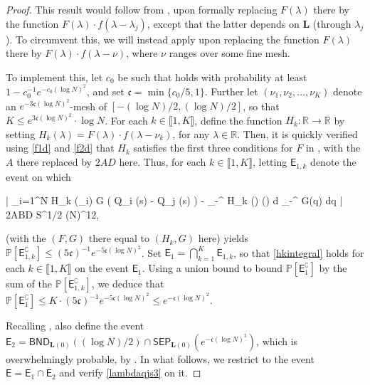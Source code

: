 \documentclass{amsart}
\numberwithin{equation}{section}
\theoremstyle{remark}
\theoremstyle{definition}
\begin{document}
	\begin{proof} 
		
		This result would follow from , upon formally replacing $F(\lambda)$ there by the function $F(\lambda) \cdot f(\lambda-\lambda_j)$, except that the latter depends on $\bm{L}$ (through $\lambda_j$). To circumvent this, we will instead apply  upon replacing the function $F(\lambda)$ there by $F(\lambda) \cdot f(\lambda - \nu)$, where $\nu$ ranges over some fine mesh. 
		
		To implement this, let $c_0$ be such that  holds with probability at least $1 - c_0^{-1} e^{-c_0 (\log N)^2}$, and set $\mathfrak{c} = \min \{ c_0 / 5, 1 \}$. Further let $(\nu_1, \nu_2, \ldots , \nu_K)$ denote an $e^{-3\mathfrak{c}(\log N)^2}$-mesh of $[ -(\log N) / 2, (\log N) / 2 ]$, so that $K \le  e^{3\mathfrak{c} (\log N)^2} \cdot \log N$. For each $k \in \llbracket 1, K \rrbracket$, define the function $H_k : \mathbb{R} \rightarrow \mathbb{R}$ by setting $H_k (\lambda) = F(\lambda) \cdot f(\lambda - \nu_k)$, for any $\lambda \in \mathbb{R}$. Then, it is quickly verified using \eqref{f1d} and \eqref{f2d} that $H_k$ satisfies the first three conditions for $F$ in , with the $A$ there replaced by $2AD$ here. Thus, for each $k \in \llbracket 1, K \rrbracket$, letting $\mathsf{E}_{1,k}$ denote the event on which 
		\begin{flalign}
			\label{hkintegral} 
			\Bigg| \displaystyle\sum_{i=1}^N H_k (\lambda_i) \cdot G ( Q_i (s) - Q_j (s) ) - \displaystyle\int_{-\infty}^{\infty} H_k (\lambda) \varrho (\lambda) d \lambda \displaystyle\int_{-\infty}^{\infty} G(\alpha q) dq \Bigg| \le 2ABD S^{1/2} (\log N)^{12},
		\end{flalign}
	
		\noindent {} (with the $(F, G)$ there equal to $(H_k, G)$ here) yields $\mathbb{P} [\mathsf{E}_{1,k}^{\complement}] \le (5\mathfrak{c})^{-1} e^{-5 \mathfrak{c} (\log N)^2}$. Set $\mathsf{E}_1 = \bigcap_{k=1}^K \mathsf{E}_{1,k}$, so that \eqref{hkintegral} holds for each $k \in \llbracket 1, K \rrbracket$ on the event $\mathsf{E}_1$. Using a union bound to bound $\mathbb{P}[\mathsf{E}_1^{\complement}]$ by the sum of the $\mathbb{P}[\mathsf{E}_{1,k}^{\complement}]$, we deduce that $\mathbb{P}[ \mathsf{E}_1^{\complement} ] \le K \cdot (5\mathfrak{c})^{-1} e^{-5 \mathfrak{c} (\log N)^2} \le e^{-\mathfrak{c} (\log N)^2}$.
		
		 Recalling , also define the event $\mathsf{E}_2 = \mathsf{BND}_{\bm{L}(0)} ( (\log N) / 2 ) \cap \mathsf{SEP}_{\bm{L}(0)} (e^{-\mathfrak{c} (\log N)^2})$, which is overwhelmingly probable, by . In what follows, we restrict to the event $\mathsf{E} = \mathsf{E}_1 \cap \mathsf{E}_2$ and verify \eqref{lambdaqjs3} on it.
		

\end{proof}
\end{document}
